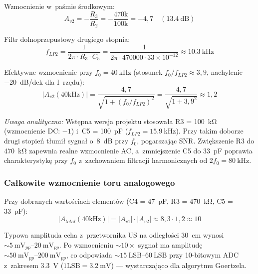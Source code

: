 \documentclass[a4paper,11pt]{article}
\begin{document}
Wzmocnienie w~paśmie środkowym:
\begin{equation}
    A_{v2} = -\frac{R_3}{R_2} = -\frac{470\text{k}}{100\text{k}} = -4{,}7 \quad (\SI{13,4}{\deci\bel})
    \label{eq:gain2}
\end{equation}

Filtr dolnoprzepustowy drugiego stopnia:
\begin{equation}
    f_{LP2} = \frac{1}{2\pi \cdot R_3 \cdot C_5} = \frac{1}{2\pi \cdot 470000 \cdot 33 \times 10^{-12}} \approx \SI{10,3}{\kilo\hertz}
    \label{eq:flp2}
\end{equation}

Efektywne wzmocnienie przy $f_0 = \SI{40}{\kilo\hertz}$ (stosunek $f_0/f_{LP2} \approx 3{,}9$,
nachylenie \SI{-20}{\deci\bel}/dek dla I~rzędu):
\begin{equation}
    |A_{v2}(40\text{kHz})| = \frac{4{,}7}{\sqrt{1 + (f_0/f_{LP2})^2}} = \frac{4{,}7}{\sqrt{1 + 3{,}9^2}} \approx 1{,}2
    \label{eq:gain2_f0}
\end{equation}

\textit{Uwaga analityczna:} Wstępna wersja projektu stosowała R3 = \SI{100}{\kilo\ohm}
(wzmocnienie DC: $-1$) i~C5 = \SI{100}{\pico\farad} ($f_{LP2} = \SI{15,9}{\kilo\hertz}$).
Przy takim doborze drugi stopień tłumił sygnał o~\SI{8}{\deci\bel} przy $f_0$,
pogarszając SNR. Zwiększenie R3 do \SI{470}{\kilo\ohm} zapewnia realne
wzmocnienie AC, a~zmniejszenie C5 do \SI{33}{\pico\farad} poprawia
charakterystykę przy $f_0$ z~zachowaniem filtracji harmonicznych
od $2f_0 = \SI{80}{\kilo\hertz}$.

\subsubsection{Całkowite wzmocnienie toru analogowego}

Przy dobranych wartościach elementów (C4 = \SI{47}{\pico\farad}, R3 = \SI{470}{\kilo\ohm},
C5 = \SI{33}{\pico\farad}):
\begin{equation}
    |A_{total}(40\text{kHz})| = |A_{v1}| \cdot |A_{v2}| \approx 8{,}3 \cdot 1{,}2 \approx 10
    \label{eq:gain_total_current}
\end{equation}

Typowa amplituda echa z~przetwornika US na odległości \SI{30}{\centi\metre}
wynosi ${\sim}\SIrange{5}{20}{\milli\volt_{pp}}$. Po wzmocnieniu ${\sim}10\times$
sygnał ma amplitudę ${\sim}\SIrange{50}{200}{\milli\volt_{pp}}$, co odpowiada
${\sim}\SIrange{15}{60}{\text{LSB}}$ przy 10-bitowym ADC z~zakresem \SI{3,3}{\volt}
($1\text{LSB} = \SI{3,2}{\milli\volt}$) --- wystarczająco dla algorytmu
Goertzela.
\end{document}
